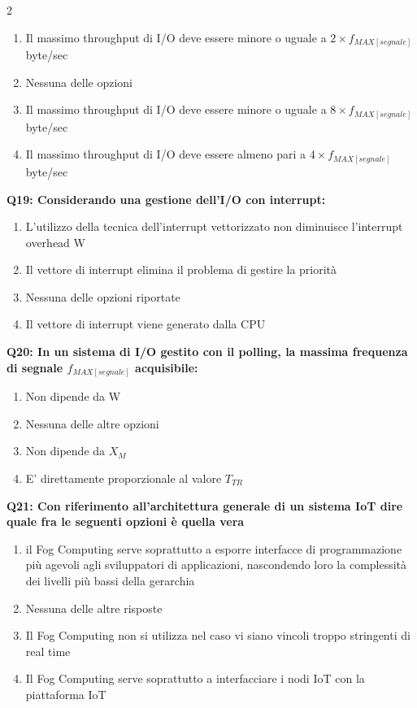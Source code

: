 \documentclass[10pt]{article}
\begin{document}
\begin{multicols}{2}
\begin{enumerate}[label=\arabic*.]
\item Il massimo throughput di I/O deve essere minore o uguale a $2 \times f_{MAX[segnale]}$ byte/sec
\item Nessuna delle opzioni
\item Il massimo throughput di I/O deve essere minore o uguale a $8 \times f_{MAX[segnale]}$ byte/sec
\item Il massimo throughput di I/O deve essere almeno pari a $4 \times f_{MAX[segnale]}$ byte/sec
\end{enumerate}
\textbf{Q19: Considerando una gestione dell’I/O con interrupt:}

\begin{enumerate}[label=\arabic*.]
\item L’utilizzo della tecnica dell’interrupt vettorizzato non diminuisce l’interrupt overhead W
\item Il vettore di interrupt elimina il problema di gestire la priorità
\item Nessuna delle opzioni riportate
\item Il vettore di interrupt viene generato dalla CPU
\end{enumerate}
\textbf{Q20: In un sistema di I/O gestito con il polling, la massima frequenza di segnale $f_{MAX[segnale]}$ acquisibile:}

\begin{enumerate}[label=\arabic*.]
\item Non dipende da W
\item Nessuna delle altre opzioni
\item Non dipende da $X_M$
\item E' direttamente proporzionale al valore $T_{TR}$
\end{enumerate}
\textbf{Q21: Con riferimento all’architettura generale di un sistema IoT dire quale fra le seguenti opzioni è quella vera}

\begin{enumerate}[label=\arabic*.]
\item il Fog Computing serve soprattutto a esporre interfacce di programmazione più agevoli agli sviluppatori di applicazioni, nascondendo loro la complessità dei livelli più bassi della gerarchia
\item Nessuna delle altre risposte
\item Il Fog Computing non si utilizza nel caso vi siano vincoli troppo stringenti di real time
\item Il Fog Computing serve soprattutto a interfacciare i nodi IoT con la piattaforma IoT
\end{enumerate}
\end{multicols}
\end{document}
